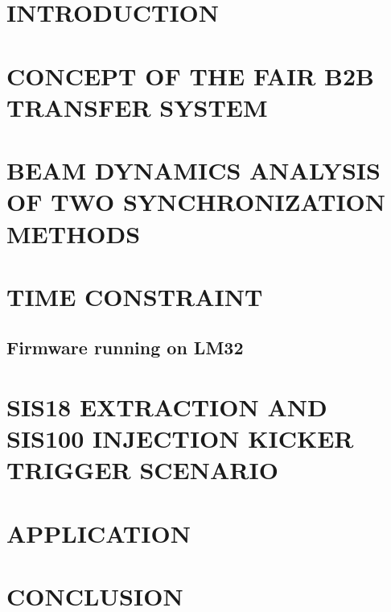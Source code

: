 \documentclass[%
 reprint,
 amsmath,amssymb,
 aps,
]{revtex4-1}
\begin{document}

\section{\label{sec:introduction}INTRODUCTION}


\section{\label{concept}CONCEPT OF THE FAIR B2B TRANSFER SYSTEM}


\section{\label{dynamics}BEAM DYNAMICS ANALYSIS OF TWO SYNCHRONIZATION METHODS}


\section{\label{timing}TIME CONSTRAINT}


\subsection{\label{testsetup}Firmware running on LM32}


%

\section{\label{kicker}SIS18 EXTRACTION AND SIS100 INJECTION KICKER TRIGGER SCENARIO}




\section{\label{application}APPLICATION}


\section{\label{conclusion}CONCLUSION}

\end{document}
